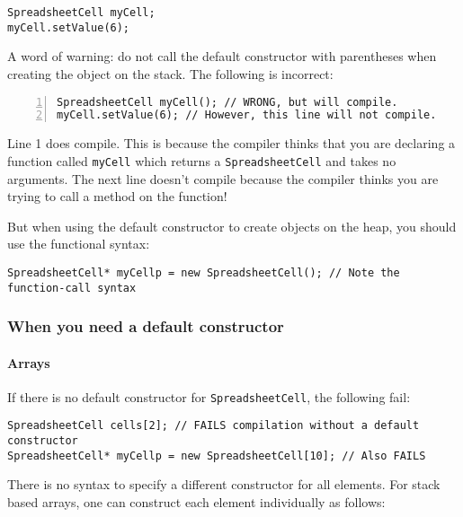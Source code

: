 \documentclass[a4paper,12pt]{article}
\begin{document}
\begin{lstlisting}
SpreadsheetCell myCell;
myCell.setValue(6);
\end{lstlisting}

A word of warning: do not call the default constructor with parentheses when creating the object on the stack. The following is incorrect:

\begin{lstlisting}[numbers=left]
SpreadsheetCell myCell(); // WRONG, but will compile.
myCell.setValue(6); // However, this line will not compile.
\end{lstlisting}

Line 1 does compile. This is because the compiler thinks that you are declaring a function called \lstinline|myCell| which returns a \lstinline|SpreadsheetCell| and takes no arguments. The next line doesn't compile because the compiler thinks you are trying to call a method on the function!

\begin{center}
  \noindent{}
\end{center}

But when using the default constructor to create objects on the heap, you should use the functional syntax:

\begin{lstlisting}
SpreadsheetCell* myCellp = new SpreadsheetCell(); // Note the function-call syntax
\end{lstlisting}

\subsubsection{When you need a default constructor}
\paragraph{Arrays}
If there is no default constructor for \lstinline|SpreadsheetCell|, the following fail:

\begin{lstlisting}
SpreadsheetCell cells[2]; // FAILS compilation without a default constructor
SpreadsheetCell* myCellp = new SpreadsheetCell[10]; // Also FAILS
\end{lstlisting}

There is no syntax to specify a different constructor for all elements. For stack based arrays, one can construct each element individually as follows:
\end{document}

